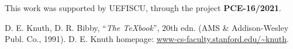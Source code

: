\documentclass[myclassdoc,debug]{rjparticle}
\begin{document}
\begin{acknowledgement}
This work was supported by UEFISCU, through the project \textbf{PCE-16/2021}.
\end{acknowledgement}


\begin{thebibliography}{99}
D. E. Knuth, D. R. Bibby, ``\textit{The \TeX book}'', 20th edn. (AMS \& Addison-Wesley Publ. Co., 1991).
 D. E. Knuth homepage: \href{http://www-cs-faculty.stanford.edu/~knuth/}{\small\ttfamily www-cs-faculty.stanford.edu/\~{}knuth}.

\end{thebibliography}
\end{document}
